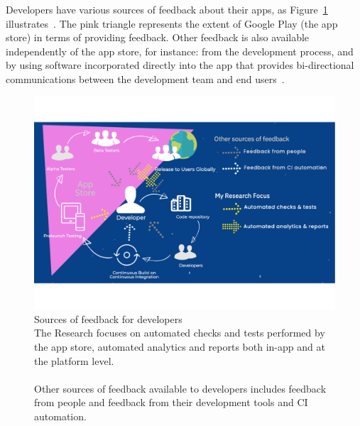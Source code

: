Developers have various sources of feedback about their apps, as Figure~\ref{fig:sources-of-feedback-for-developers} illustrates~. The pink triangle represents the extent of Google Play (the app store) in terms of providing feedback. Other feedback is also available independently of the app store, for instance: from the development process, and by using software incorporated directly into the app that provides bi-directional communications between the development team and end users~.

\begin{figure}
    \includegraphics[width=\linewidth]{images/mobilesoft/silvias-developer-centric-figure-mobilesoft2020.pdf}
    \caption[Sources of feedback for developers]{Sources of feedback for developers \\The Research focuses on automated checks and tests performed by the app store, automated analytics and reports both in-app and at the platform level. \\ \\Other sources of feedback available to developers includes feedback from people and feedback from their development tools and CI automation.}
    \label{fig:sources-of-feedback-for-developers}
\end{figure}

